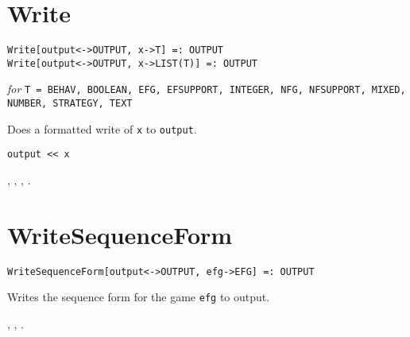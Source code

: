
\section*{Write}\label{PrimWrite}
\begin{verbatim}
Write[output<->OUTPUT, x->T] =: OUTPUT  
Write[output<->OUTPUT, x->LIST(T)] =: OUTPUT
\end{verbatim}
\textit{for} \texttt{T = BEHAV, BOOLEAN, EFG, EFSUPPORT, INTEGER,
NFG, NFSUPPORT, MIXED, NUMBER, STRATEGY, TEXT}

\noindent
Does a formatted write of \verb+x+ to \verb+output+.

\shortform \verb+output << x+

\seealso {}, ,
, .


\section*{WriteSequenceForm}\label{PrimWriteSequenceForm}
\begin{verbatim} 
WriteSequenceForm[output<->OUTPUT, efg->EFG] =: OUTPUT
\end{verbatim}

\noindent
Writes the sequence form for the game \verb+efg+ to output.  

\seealso {},
,
.




